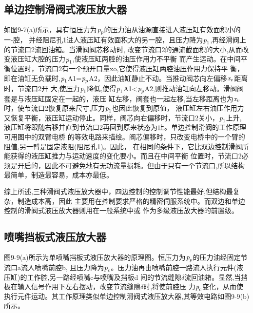 \subsection{单边控制滑阀式液压放大器}

如图9-7(a)所示，具有恒压力为$\emph{p}_p$的压力油从油源直接进人液压缸有效面积小的一-腔，
并经阻尼孔1进人液压缸有效面积大的另一腔，且压力降为$\emph{p}_1$,再经滑阀上的节流口2流回油箱。当滑阀阀芯移动时,
改变节流口2的通流截面积的大小,从而改变液压缸大腔的压力$\emph{p}_1$,使液压缸两腔的油压作用力不平衡
而产生运动。在中间平衡位置时，节流口2有一个预开口量xo,它使得液压缸两腔油压作用力保持平
衡，即在油缸无负载时,$\emph{p}_1$A1=$\emph{p}_p$A2，因此油缸静止不动。当推动阀芯向左偏移$\emph{x}_v$距离时，节流口2开
大,使压力$\emph{p}_1$降低,使得$\emph{p}_1$A1\textless $\emph{p}_p$A2,则推动油缸向左移动。滑阀阀套是与液压缸固定在一起的，液压
缸左移，阀套也一起左移,当左移距离也为$\emph{x}_v$时，使节流口2恢复原来尺寸,压力$\emph{p}_1$也因此恢复到原值，
液压缸左右油压作用力又恢复平衡，液压缸运动停止。同样，阀芯向右偏移时，节流口2关小，$\emph{p}_1$上升,
液压缸将跟随右移并直到节流口2再回到原来状态为止。单边控制滑阀的工作原理可用图中的双臂电桥
的等效电路来描绘。阀芯偏移时，只改变电桥中的一个臂的阻值,另一臂是固定液阻(阻尼孔1)。因此，
在相同的条件下，它比双边控制滑阀所能获得的液压缸推力与运动速度的变化要小。而且在中间平衡
位置时，节流口2必须是开启的，因此不可避免地有无功流量损耗。但由于只有一个节流口,所以结构
最简单，制造最容易，成本亦最低。

综上所述,三种滑阀式液压放大器中，四边控制的控制调节性能最好,但结构最复杂，制造成本高，因此
主要用在控制要求严格的精密伺服系统中。而双边和单边控制的滑阀式液压放大器则用在一般系统中或
作为多级液压放大器的前置级。
\subsection{喷嘴挡板式液压放大器}
图9-9(a)所示为单喷嘴挡板式液压放大器的原理图。恒压力为$\emph{p}_p$的压力油经固定节流口a流人喷嘴前腔b,
且压力降为$\emph{p}_c$。压力油再由喷嘴前腔一路流人执行元件(液压缸)的工作腔,另一路经喷嘴c与喷嘴及挡板d
间的节流缝隙$\delta$流回油箱。显然,当挡板在输入信号作用下左右摆动，改变节流缝隙$\delta$时,将使前腔压
力$\emph{p}_c$变化，从而使执行元件运动。其工作原理类似单边控制滑阀式液压放大器,其等效电路如图9-9(b)所示。

